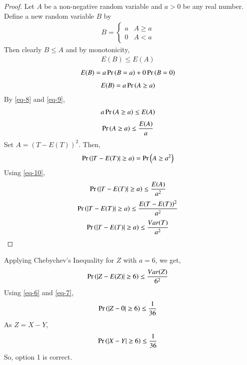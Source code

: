 \documentclass[journal,12pt,twocolumn]{IEEEtran}
\begin{document}
\begin{proof}
Let $A$ be a non-negative random variable and $a>0$ be any real number. Define a new random variable $B$ by
\begin{align}
B=  \begin{cases} 
          a & A \geq a \\
          0 & A < a
    \end{cases}
\end{align}
Then clearly $B \leq A$ and by monotonicity,
\begin{align} \label{eq-8}
    E(B) \leq E(A)
\end{align}
\begin{align}
    E(B)=a\Pr\left(B=a\right)+0\Pr\left(B=0\right)
\end{align}
\begin{align} \label{eq-9}
    E(B)=a\Pr\left(A \geq a\right)
\end{align}
By \eqref{eq-8} and \eqref{eq-9},
\begin{align}
    a\Pr\left(A \geq a\right) \leq  E(A)
\end{align}
\begin{align} \label{eq-10}
    \Pr\left(A \geq a\right) \leq \dfrac{E(A)}{a}
\end{align}
Set $A=(T-E(T))^2$. Then,
\begin{align}
    \Pr\left(|T-E(T)| \geq a\right)=\Pr\left(A \geq a^2\right)
\end{align}
Using \eqref{eq-10},
\begin{align}
    \Pr\left(|T-E(T)| \geq a\right) \leq \dfrac{E(A)}{a^2}
\end{align}
\begin{align}
    \Pr\left(|T-E(T)| \geq a\right) \leq \dfrac{E(T-E(T))^2}{a^2}
\end{align}
\begin{align}
    \Pr\left(|T-E(T)| \geq a\right) \leq \dfrac{Var(T)}{a^2}
\end{align}
\end{proof}
Applying Chebychev's Inequality for $Z$ with $a=6$, we get,
\begin{align}
    \Pr\left(|Z-E(Z)| \geq 6\right) \leq \dfrac{Var(Z)}{6^2}
\end{align}
Using \eqref{eq-6} and \eqref{eq-7},
\begin{align}
    \Pr\left(|Z-0| \geq 6\right) \leq \dfrac{1}{36}
\end{align}
As $Z=X-Y$,
\begin{align}
    \Pr\left(|X-Y| \geq 6\right) \leq \dfrac{1}{36}
\end{align}
So, option 1 is correct.
\end{document}
